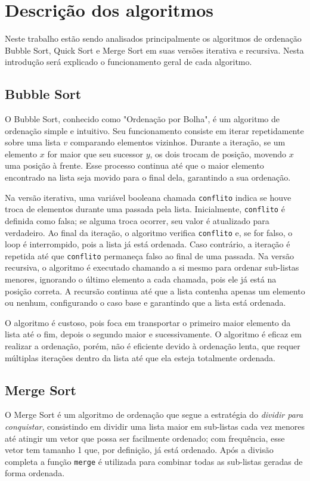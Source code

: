 \section*{Descrição dos algoritmos}
\hspace{0.6cm}Neste trabalho estão sendo analisados principalmente os algoritmos de ordenação Bubble Sort, Quick Sort e Merge Sort em suas versões iterativa e recursiva. Nesta introdução será explicado o funcionamento geral de cada algoritmo.
\subsection*{Bubble Sort}
\hspace{0.6cm}O Bubble Sort, conhecido como "Ordenação por Bolha", é um algoritmo de ordenação simple e intuitivo. Seu funcionamento consiste em iterar repetidamente sobre uma lista $v$ comparando elementos vizinhos. Durante a iteração, se um elemento $x$ for maior que seu sucessor $y$, os dois trocam de posição, movendo $x$ uma posição à frente. Esse processo continua até que o maior elemento encontrado na lista seja movido para o final dela, garantindo a sua ordenação.

Na versão iterativa, uma variável booleana chamada \texttt{conflito} indica se houve troca de elementos durante uma passada pela lista. Inicialmente, \texttt{conflito} é definida como falsa; se alguma troca ocorrer, seu valor é atualizado para verdadeiro. Ao final da iteração, o algoritmo verifica \texttt{conflito} e, se for falso, o loop é interrompido, pois a lista já está ordenada. Caso contrário, a iteração é repetida até que \texttt{conflito} permaneça falso ao final de uma passada. Na versão recursiva, o algoritmo é executado chamando a si mesmo para ordenar sub-listas menores, ignorando o último elemento a cada chamada, pois ele já está na posição correta. A recursão continua até que a lista contenha apenas um elemento ou nenhum, configurando o caso base e garantindo que a lista está ordenada.

O algoritmo é custoso, pois foca em transportar o primeiro maior elemento da lista até o fim, depois o segundo maior e sucessivamente. O algoritmo é eficaz em realizar a ordenação, porém, não é eficiente devido à ordenação lenta, que requer múltiplas iterações dentro da lista até que ela esteja totalmente ordenada. 

\subsection*{Merge Sort}
\hspace{0.6cm}O Merge Sort é um algoritmo de ordenação que segue a estratégia do \textit{dividir para conquistar}, consistindo em dividir uma lista maior em sub-listas cada vez menores até atingir um vetor que possa ser facilmente ordenado; com frequência, esse vetor tem tamanho 1 que, por definição, já está ordenado. Após a divisão completa a função \texttt{merge} é utilizada para combinar todas as sub-listas geradas de forma ordenada. 

